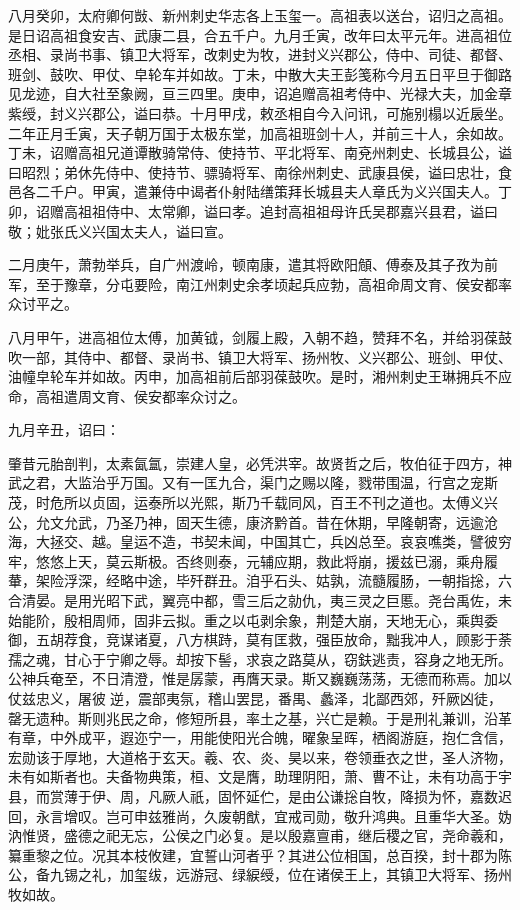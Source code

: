 \documentclass[]{article}
\begin{document}
八月癸卯，太府卿何敱、新州刺史华志各上玉玺一。高祖表以送台，诏归之高祖。是日诏高祖食安吉、武康二县，合五千户。九月壬寅，改年曰太平元年。进高祖位丞相、录尚书事、镇卫大将军，改刺史为牧，进封义兴郡公，侍中、司徒、都督、班剑、鼓吹、甲仗、皁轮车并如故。丁未，中散大夫王彭笺称今月五日平旦于御路见龙迹，自大社至象阙，亘三四里。庚申，诏追赠高祖考侍中、光禄大夫，加金章紫绶，封义兴郡公，谥曰恭。十月甲戌，敕丞相自今入问讯，可施别榻以近扆坐。二年正月壬寅，天子朝万国于太极东堂，加高祖班剑十人，并前三十人，余如故。丁未，诏赠高祖兄道谭散骑常侍、使持节、平北将军、南兗州刺史、长城县公，谥曰昭烈；弟休先侍中、使持节、骠骑将军、南徐州刺史、武康县侯，谥曰忠壮，食邑各二千户。甲寅，遣兼侍中谒者仆射陆缮策拜长城县夫人章氏为义兴国夫人。丁卯，诏赠高祖祖侍中、太常卿，谥曰孝。追封高祖祖母许氏吴郡嘉兴县君，谥曰敬；妣张氏义兴国太夫人，谥曰宣。

二月庚午，萧勃举兵，自广州渡岭，顿南康，遣其将欧阳頠、傅泰及其子孜为前军，至于豫章，分屯要险，南江州刺史余孝顷起兵应勃，高祖命周文育、侯安都率众讨平之。

八月甲午，进高祖位太傅，加黄钺，剑履上殿，入朝不趋，赞拜不名，并给羽葆鼓吹一部，其侍中、都督、录尚书、镇卫大将军、扬州牧、义兴郡公、班剑、甲仗、油幢皁轮车并如故。丙申，加高祖前后部羽葆鼓吹。是时，湘州刺史王琳拥兵不应命，高祖遣周文育、侯安都率众讨之。

九月辛丑，诏曰：

肇昔元胎剖判，太素氤氲，崇建人皇，必凭洪宰。故贤哲之后，牧伯征于四方，神武之君，大监治乎万国。又有一匡九合，渠门之赐以隆，戮带围温，行宫之宠斯茂，时危所以贞固，运泰所以光熙，斯乃千载同风，百王不刊之道也。太傅义兴公，允文允武，乃圣乃神，固天生德，康济黔首。昔在休期，早隆朝寄，远逾沧海，大拯交、越。皇运不造，书契未闻，中国其亡，兵凶总至。哀哀噍类，譬彼穷牢，悠悠上天，莫云斯极。否终则泰，元辅应期，救此将崩，援兹已溺，乘舟履輂，架险浮深，经略中途，毕歼群丑。洎乎石头、姑孰，流髓履肠，一朝指捴，六合清晏。是用光昭下武，翼亮中都，雪三后之勍仇，夷三灵之巨慝。尧台禹佐，未始能阶，殷相周师，固非云拟。重之以屯剥余象，荆楚大崩，天地无心，乘舆委御，五胡荐食，竞谋诸夏，八方棋跱，莫有匡救，强臣放命，黜我冲人，顾影于荼孺之魂，甘心于宁卿之辱。却按下髻，求哀之路莫从，窃鈇逃责，容身之地无所。公神兵奄至，不日清澄，惟是孱蒙，再膺天录。斯又巍巍荡荡，无德而称焉。加以仗兹忠义，屠彼逆，震部夷氛，稽山罢昆，番禺、蠡泽，北鄙西郊，歼厥凶徒，罄无遗种。斯则兆民之命，修短所县，率土之基，兴亡是赖。于是刑礼兼训，沿革有章，中外成平，遐迩宁一，用能使阳光合魄，曜象呈晖，栖阁游庭，抱仁含信，宏勋该于厚地，大道格于玄天。羲、农、炎、昊以来，卷领垂衣之世，圣人济物，未有如斯者也。夫备物典策，桓、文是膺，助理阴阳，萧、曹不让，未有功高于宇县，而赏薄于伊、周，凡厥人祇，固怀延伫，是由公谦捴自牧，降损为怀，嘉数迟回，永言增叹。岂可申兹雅尚，久废朝猷，宜戒司勋，敬升鸿典。且重华大圣。妫汭惟贤，盛德之祀无忘，公侯之门必复。是以殷嘉亶甫，继后稷之官，尧命羲和，纂重黎之位。况其本枝攸建，宜誓山河者乎？其进公位相国，总百揆，封十郡为陈公，备九锡之礼，加玺绂，远游冠、绿綟绶，位在诸侯王上，其镇卫大将军、扬州牧如故。
\end{document}
